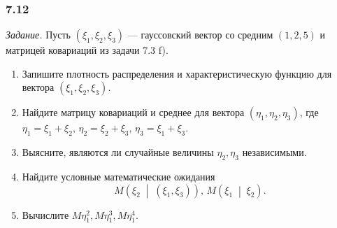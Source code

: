 \subsubsection*{7.12}

\textit{Задание.}
Пусть $ \left( \xi_1, \xi_2, \xi_3 \right) $ ---
гауссовский вектор со средним $ \left( 1, 2, 5 \right) $ и матрицей ковариаций из задачи 7.3 f).
\begin{enumerate}[label=\alph*)]
  \item Запишите плотность распределения и характеристическую функцию для вектора
  $ \left( \xi_1, \xi_2, \xi_3 \right) $.
  \item Найдите матрицу ковариаций и среднее для вектора $ \left( \eta_1, \eta_2, \eta_3 \right) $,
  где $ \eta_1 = \xi_1 + \xi_2, \, \eta_2 = \xi_2 + \xi_3, \, \eta_3 = \xi_1 + \xi_3$.
  \item Выясните, являются ли случайные величины $ \eta_2, \eta_3$ независимыми.
  \item Найдите условные математические ожидания
  $$M \left( \xi_2 \; \middle| \; \left( \xi_1, \xi_3 \right) \right), \,
    M \left( \xi_1 \; \middle| \; \xi_2 \right).$$
  \item Вычислите $M \eta_1^2, M \eta_1^3, M \eta_1^4$.
\end{enumerate}

